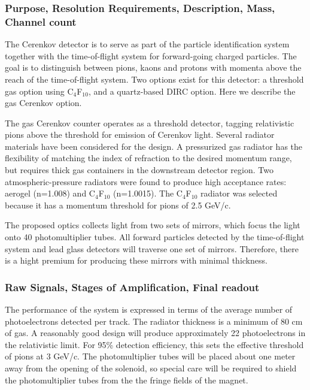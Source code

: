 \subsubsection*{Purpose, Resolution Requirements, Description, Mass, Channel count}

The Cerenkov detector is to serve as part of the particle identification system
together with the time-of-flight system for forward-going charged particles.
The goal is to distinguish between pions, kaons and protons with
momenta above the reach of the time-of-flight system. Two options exist for this
detector: a threshold gas option using C$_4$F$_{10}$, and a quartz-based DIRC
option. Here we describe the gas Cerenkov option.

The gas Cerenkov counter operates as a threshold detector, tagging relativistic
pions above the threshold for emission of Cerenkov light. Several radiator materials have
been considered for the design. A pressurized gas radiator has the flexibility of
matching the index of refraction to the desired momentum range, but requires
thick gas containers in the downstream detector region. Two atmospheric-pressure
radiators were found to produce high acceptance rates: aerogel (n=1.008) and C$_4$F$_{10}$
(n=1.0015). The C$_4$F$_{10}$ radiator was selected because it has a momentum
threshold for pions of 2.5 GeV/c.

The proposed optics collects light from two sets of mirrors, which focus
the light onto 40 photomultiplier tubes. All forward particles detected by the
time-of-flight system and lead glass detectors will traverse one set of 
mirrors. Therefore, there is a hight premium for producing these mirrors with
minimal thickness.


\subsubsection*{Raw Signals, Stages of Amplification, Final readout}

The performance of the system is expressed in terms of the average number
of photoelectrons detected per track. The radiator thickness is a minimum
of 80 cm of gas. A reasonably good design will produce
approximately 22 photoelectrons in the relativistic limit. For 95\%
detection efficiency, this sets the effective threshold of pions at 3 GeV/c.
The photomultiplier tubes will be placed about one meter away from the
opening of the solenoid, so special care will be required to
shield the photomultiplier tubes from the the fringe fields of the magnet.

